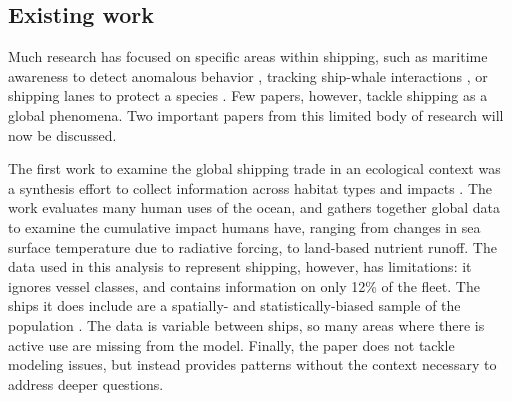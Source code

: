 \documentclass[12pt,letterpaper]{article}
\begin{document}



\subsection{Existing work}

Much research has focused on specific areas within shipping, such as maritime awareness to detect anomalous behavior \citep{Tun2007}, tracking ship-whale interactions \citep{jensen2004large}, or shipping lanes to protect a species \citep{Lagueux2011,Mckenna2012a}.  Few papers, however, tackle shipping as a global phenomena. Two important papers from this limited body of research will now be discussed.

The first work %
to examine the global shipping trade in an ecological context was a synthesis effort to collect information across habitat types and impacts \citep{Halpern2008}. The work evaluates many human uses of the ocean, and gathers together global data to examine the cumulative impact humans have, ranging from changes in sea surface temperature due to radiative forcing, to land-based nutrient runoff. The data used in this analysis to represent shipping, however, has limitations: it ignores vessel classes, %
 and contains information on only 12\% of the fleet. The ships it does include are a spatially- and statistically-biased sample of the population \citep{Wang2007}. The data is variable between ships, so many areas where there is active use are missing from the model. Finally, the paper does not tackle modeling issues, but instead provides patterns without the context necessary to address deeper questions. %
\end{document}
